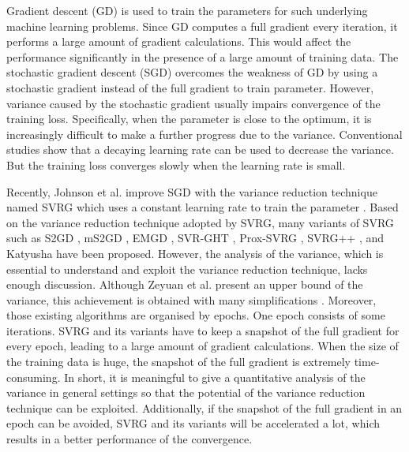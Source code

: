 \documentclass[letterpaper]{article}
\begin{document}
Gradient descent (GD) is used to train the parameters for such underlying machine learning problems. Since GD computes a full gradient every iteration, it performs a large amount of gradient calculations.  This would affect the performance significantly in the presence of a large amount of training data. The stochastic gradient descent (SGD) overcomes the weakness of GD by using a stochastic gradient instead of the full gradient to train parameter. However, variance caused by the stochastic gradient usually impairs convergence of the training loss. Specifically, when the parameter is close to the optimum, it is increasingly difficult to make a further progress  due to the variance. Conventional studies show that a decaying learning rate can be used to decrease the variance. But the training loss converges slowly when the learning rate is small. 

Recently, Johnson et al. improve SGD with the variance reduction technique named SVRG which uses a constant learning rate to train the parameter \cite{Johnson:9MAvkbgy}.  Based on the variance reduction technique adopted by SVRG, many variants of SVRG such as S2GD \cite{Richtarik:2013te}, mS2GD \cite{Liu:2015bx}, EMGD \cite{Zhang2013Linear}, SVR-GHT \cite{Li:2016vh}, Prox-SVRG \cite{Xiao:2014vw}, SVRG++ \cite{Allen2015Improved}, and Katyusha \cite{Allenzhu2016Katyusha} have been proposed. However, the analysis of the variance, which is essential to understand and exploit the variance reduction technique, lacks enough discussion. Although Zeyuan et al.  present an upper bound of the variance, this  achievement is obtained with many  simplifications \cite{AllenZhu:2016up}. Moreover, those existing algorithms are organised by epochs. One epoch consists of some iterations. SVRG and its variants have to keep a snapshot of the full gradient for every epoch, leading to a large amount of gradient calculations. When the size of the training data is huge, the snapshot of the full gradient is extremely time-consuming.   In short, it is meaningful to give a quantitative analysis  of the variance in general settings so that the potential of the variance reduction technique can be exploited.  Additionally, if the snapshot of the full gradient in an epoch can be avoided, SVRG and its variants will be accelerated a lot, which results in a better performance of the convergence.
 
\end{document}
